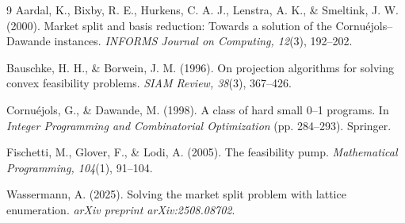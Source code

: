 \documentclass[12pt]{article}
\begin{document}
\begin{thebibliography}{9}
Aardal, K., Bixby, R. E., Hurkens, C. A. J., Lenstra, A. K., \& Smeltink, J. W. (2000). Market split and basis reduction: Towards a solution of the Cornu\'ejols--Dawande instances. \emph{INFORMS Journal on Computing, 12}(3), 192--202.

Bauschke, H. H., \& Borwein, J. M. (1996). On projection algorithms for solving convex feasibility problems. \emph{SIAM Review, 38}(3), 367--426.

Cornu\'ejols, G., \& Dawande, M. (1998). A class of hard small 0--1 programs. In \emph{Integer Programming and Combinatorial Optimization} (pp. 284--293). Springer.

Fischetti, M., Glover, F., \& Lodi, A. (2005). The feasibility pump. \emph{Mathematical Programming, 104}(1), 91--104.

Wassermann, A. (2025). Solving the market split problem with lattice enumeration. \emph{arXiv preprint arXiv:2508.08702}.
\end{thebibliography}
\end{document}
